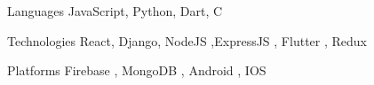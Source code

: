 

\begin{cvskills}
  \cvskill
    {Languages} %
    {JavaScript, Python, Dart, C} %

  \cvskill
    {Technologies} %
    {React, Django, NodeJS ,ExpressJS , Flutter , Redux} %

  \cvskill
    {Platforms} %
    {Firebase , MongoDB , Android , IOS} %

\end{cvskills}
